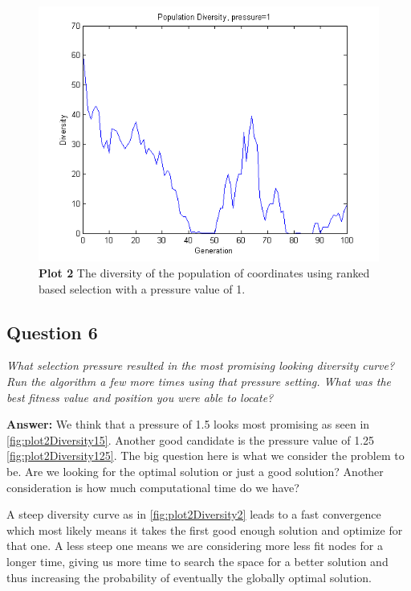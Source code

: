 \documentclass[a4paper]{article}
\begin{document}
\begin{figure}[H] %
	\includegraphics[scale=0.7]{divPress1.png}
	\caption{\label{fig:plot2Diversity1}\textbf{Plot 2} The diversity of the population of coordinates using ranked based selection with a pressure value of 1.}
\end{figure}

\subsection*{Question 6} \emph{What selection pressure resulted in the most
    promising looking diversity curve? Run the algorithm a few more times using
that pressure setting. What was the best fitness value and position you were
able to locate?}

\textbf{Answer:} We think that a pressure of 1.5 looks most promising as seen
in \ref{fig:plot2Diversity15}. Another good candidate is the pressure value of
1.25 \ref{fig:plot2Diversity125}. The big question here is what we consider the
problem to be. Are we looking for the optimal solution or just a good solution?
Another consideration is how much computational time do we have? 

A steep diversity curve as in \ref{fig:plot2Diversity2} leads to a fast
convergence which most likely means it takes the first good enough solution and
optimize for that one. A less steep one means we are considering more less fit
nodes for a longer time, giving us more time to search the space for a better
solution and thus increasing the probability of eventually the globally optimal
solution.
\end{document}
